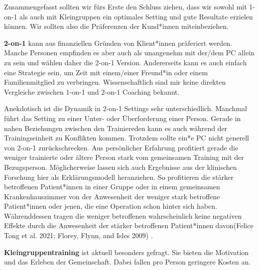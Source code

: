 \documentclass[
  letterpaper,
  DIV=11,
  numbers=noendperiod]{scrreprt}
\begin{document}
Zusammengefasst sollten wir fürs Erste den Schluss ziehen, dass wir
sowohl mit 1-on-1 als auch mit Kleingruppen ein optimales Setting und
gute Resultate erzielen können. Wir sollten also die Präferenzen der
Kund*innen miteinbeziehen.

\textbf{2-on-1} kann aus finanziellen Gründen von Klient*innen
präferiert werden. Manche Personen empfinden es aber auch als unangenehm
mit der/dem PC allein zu sein und wählen daher die 2-on-1 Version.
Andererseits kann es auch einfach eine Strategie sein, um Zeit mit
einem/einer Freund*in oder einem Familienmitglied zu verbringen.
Wissenschaftlich sind mir keine direkten Vergleiche zwischen 1-on-1 und
2-on-1 Coaching bekannt.

Anekdotisch ist die Dynamik in 2-on-1 Settings sehr unterschiedlich.
Manchmal führt das Setting zu einer Unter- oder Überforderung einer
Person. Gerade in nahen Beziehungen zwischen den Trainiereden kann es
auch während der Trainingseinheit zu Konflikten kommen. Trotzdem sollte
ein*e PC nicht generell von 2-on-1 zurückschrecken. Aus persönlicher
Erfahrung profitiert gerade die weniger trainierte oder ältere Person
stark vom gemeinsamen Training mit der Bezugsperson. Möglicherweise
lassen sich auch Ergebnisse aus der klinischen Forschung hier als
Erklärungsmodell heranziehen. So profitieren die stärker betroffenen
Patient*innen in einer Gruppe oder in einem gemeinsamen
Krankenhauszimmer von der Anwesenheit der weniger stark betroffene
Patient*innen oder jenen, die eine Operation schon hinter sich haben.
Währenddessen tragen die weniger betroffenen wahrscheinlich keine
negativen Effekte durch die Anwesenheit der stärker betroffenen
Patient*innen davon(Felice Tong et al. 2021; Florey, Flynn, and Isles
2009) .

\textbf{Kleingruppentraining} ist aktuell besonders gefragt. Sie bieten
die Motivation und das Erleben der Gemeinschaft. Dabei fallen pro Person
geringere Kosten an.
\end{document}
